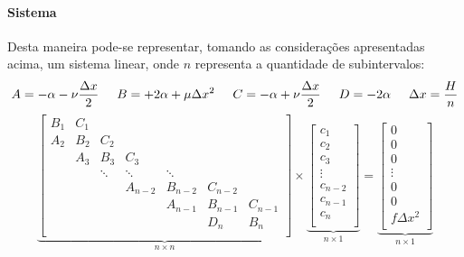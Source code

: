 \documentclass{article}
\begin{document}
        \paragraph{Sistema}Desta maneira pode-se representar, tomando as considerações apresentadas acima, um sistema linear, onde $n$ representa a quantidade de subintervalos:
            \[
                A = -\alpha-\nu\frac{\Delta x}{2} \hspace{5mm}
                B = +2\alpha+\mu\Delta x^2 \hspace{5mm}
                C = -\alpha+\nu\frac{\Delta x}{2} \hspace{5mm}
                D = -2\alpha \hspace{5mm}
                \Delta x = \frac{H}{n}
            \]
            \begin{equation}
                \boxed{
                    \underbrace{\begin{bmatrix}
                        B_{1} & C_{1} &        &         &         &   &\\
                        A_{2} & B_{2} & C_{2}  &         &         &   &\\
                              & A_{3} & B_{3}  & C_{3}   &         &   &\\
                              &       & \ddots & \ddots  & \ddots  &   &\\
                              &       &        & A_{n-2} & B_{n-2} & C_{n-2} &\\
                              &       &        &         & A_{n-1} & B_{n-1} & C_{n-1}\\
                              &       &        &         &         & D_{n}   & B_{n}\\
                    \end{bmatrix}}_{n \times n} \times
                    \underbrace{\begin{bmatrix}
                        c_{1}\\
                        c_{2}\\
                        c_{3}\\
                        \vdots\\
                        c_{n-2}\\
                        c_{n-1}\\
                        c_{n}\\
                    \end{bmatrix}}_{n \times 1} = 
                    \underbrace{\begin{bmatrix}
                        0\\
                        0\\
                        0\\
                        \vdots\\
                        0\\
                        0\\
                        f\Delta x^2\\
                    \end{bmatrix}}_{n \times 1}
                }
            \end{equation}
\end{document}
